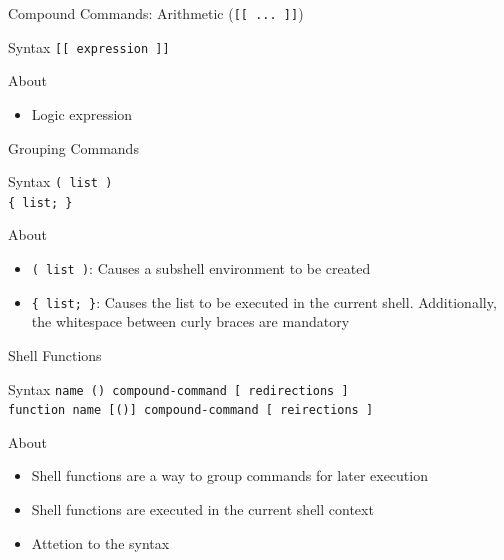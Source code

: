 \documentclass[10pt, compress, aspectratio=169]{beamer}
\begin{document}
\begin{frame}{Compound Commands: Arithmetic (\texttt{[[ ... ]]})}
  \begin{alertblock}{Syntax}
    \texttt{[[ expression ]]}
  \end{alertblock}
  \begin{exampleblock}{About}
    \begin{itemize}
      \item Logic expression
    \end{itemize}
  \end{exampleblock}
\end{frame}

\begin{frame}{Grouping Commands}
  \begin{alertblock}{Syntax}
    \texttt{( list )} \\
    \texttt{\{ list; \}}
  \end{alertblock}
  \begin{exampleblock}{About}
    \begin{itemize}
      \item \texttt{( list )}: Causes a subshell environment to be created
      \item \texttt{\{ list; \}}: Causes the list to be executed in the current
            shell. Additionally, the whitespace between curly braces are
            mandatory
    \end{itemize}
  \end{exampleblock}
\end{frame}

\begin{frame}{Shell Functions}
  \begin{alertblock}{Syntax}
    \texttt{name () compound-command [ redirections ]} \\
    \texttt{function name [()] compound-command [ reirections ]}
  \end{alertblock}
  \begin{exampleblock}{About}
    \begin{itemize}
      \item Shell functions are a way to group commands for later execution
      \item Shell functions are executed in the current shell context
      \item Attetion to the syntax
    \end{itemize}
  \end{exampleblock}
\end{frame}
\end{document}
